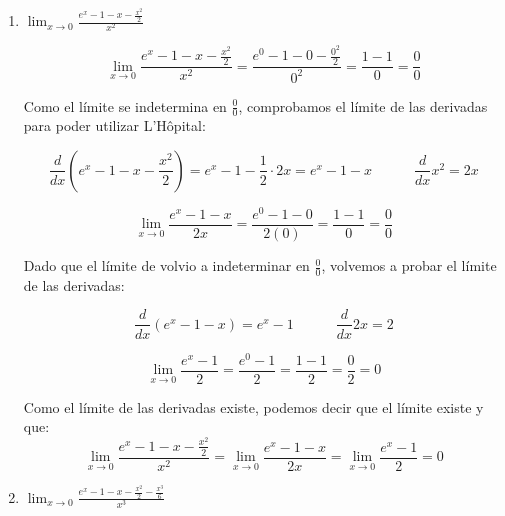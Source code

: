 \documentclass[12pt]{article}
\begin{document}
\begin{enumerate}[\hspace{9px} a)]
    \item \(\displaystyle\lim_{x \to 0}\frac{e^x-1-x-\frac{x^2}{2}}{x^2}\)\bigskip
    
        \begin{equation*}
            \lim_{x \to 0}\frac{e^x-1-x-\frac{x^2}{2}}{x^2} = \frac{e^0-1-0-\frac{0^2}{2}}{0^2} = \frac{1-1}{0} = \frac{0}{0}
        \end{equation*}

        Como el l\'imite se indetermina en \(\displaystyle\frac{0}{0}\), comprobamos el l\'imite de las derivadas para poder utilizar L'H\^opital:

        \begin{equation*}
            \frac{d}{dx}\left(e^x-1-x-\frac{x^2}{2}\right) = e^x-1-\frac{1}{2}\cdot2x = e^x-1-x \qquad \quad \frac{d}{dx}x^2=2x
        \end{equation*}

        \begin{equation*}
            \lim_{x \to 0}\frac{e^x-1-x}{2x} = \frac{e^0-1-0}{2(0)} = \frac{1-1}{0} = \frac{0}{0}
        \end{equation*}

        Dado que el l\'imite de volvio a indeterminar en \(\displaystyle\frac{0}{0}\), volvemos a probar el l\'imite de las derivadas:

        \begin{equation*}
            \frac{d}{dx}(e^x-1-x) = e^x-1 \qquad \quad \frac{d}{dx}2x = 2
        \end{equation*}

        \begin{equation*}
            \lim_{x \to 0}\frac{e^x-1}{2} = \frac{e^0-1}{2} = \frac{1-1}{2} = \frac{0}{2} = 0
        \end{equation*}

        Como el l\'imite de las derivadas existe, podemos decir que el l\'imite existe y que:
        \begin{equation*}
            \lim_{x \to 0}\frac{e^x-1-x-\frac{x^2}{2}}{x^2} = \lim_{x \to 0}\frac{e^x-1-x}{2x} = \lim_{x \to 0}\frac{e^x-1}{2} = 0
        \end{equation*}

    \item \(\displaystyle\lim_{x \to 0}\frac{e^x-1-x-\frac{x^2}{2}-\frac{x^3}{6}}{x^3}\)
    

\end{enumerate}
\end{document}
